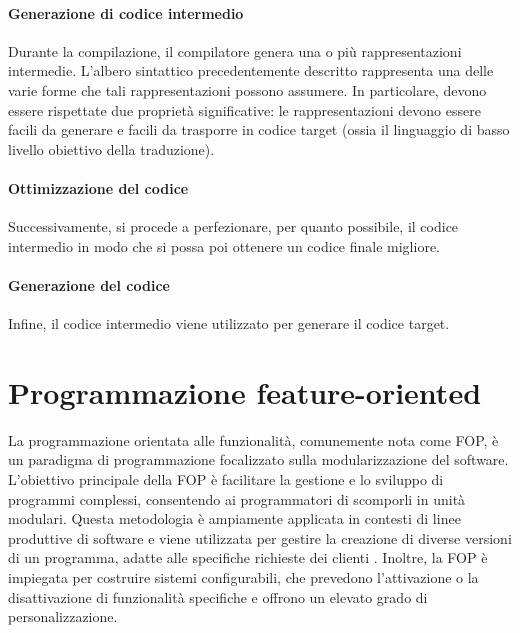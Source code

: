 \documentclass[12pt,a4paper,openright,twoside]{book}
\begin{document}
\paragraph{Generazione di codice intermedio}
Durante la compilazione, il compilatore genera una o più rappresentazioni intermedie. 
L'albero sintattico precedentemente descritto rappresenta una delle varie forme che tali rappresentazioni possono assumere. In particolare, 
devono essere rispettate due proprietà significative: le rappresentazioni devono essere facili da generare e facili da trasporre in codice 
target (ossia il linguaggio di basso livello obiettivo della traduzione).

\paragraph{Ottimizzazione del codice}
Successivamente, si procede a perfezionare, per quanto possibile, il codice intermedio in modo 
che si possa poi ottenere un codice finale migliore.

\paragraph{Generazione del codice}
Infine, il codice intermedio viene utilizzato per generare il codice target.

\section{Programmazione feature-oriented}
La programmazione orientata alle funzionalità, comunemente nota come \ac{FOP}, è un paradigma di programmazione focalizzato sulla modularizzazione 
del software. L’obiettivo principale della \ac{FOP} è facilitare la gestione e lo sviluppo di programmi complessi, consentendo ai programmatori 
di scomporli in unità modulari. Questa metodologia è ampiamente applicata in contesti di linee produttive di software e viene utilizzata per 
gestire la creazione di diverse versioni di un programma, adatte alle specifiche richieste dei clienti \cite{Apel2013}. Inoltre, la \ac{FOP} è 
impiegata per costruire sistemi configurabili, che prevedono l’attivazione o la disattivazione di funzionalità specifiche e offrono un elevato 
grado di personalizzazione.
\end{document}
